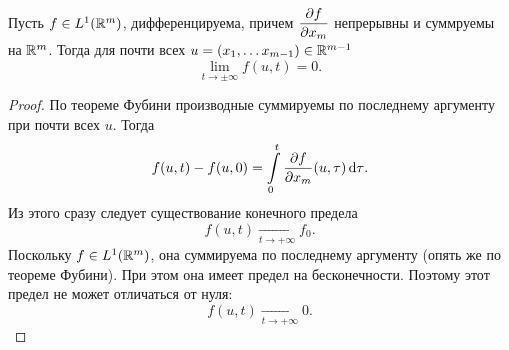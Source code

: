 \begin{lemma}
    Пусть $f \in L^1(\mathbb{R}^m)$, дифференцируема, причем $\dfrac{\partial f}{\partial x_m}$
    непрерывны и суммруемы на $\mathbb{R}^m$. Тогда для почти всех
    $u = (x_1, \ldots x_{m - 1}) \in \mathbb{R}^{m - 1}$
    \[
        \lim_{t \to \pm \infty}{f(u, t)} = 0
    .\]
\end{lemma}
\begin{proof}
    По теореме Фубини производные суммируемы по последнему аргументу
    при почти всех $u$. Тогда
    \[
        f(u, t) - f(u, 0) = \int\limits_0^t{\dfrac{\partial f}{\partial x_m}(u, \tau) \,\mathrm{d} \tau}
    .\]
    Из этого сразу следует существование конечного предела
    \[
        f(u, t) \xrightarrow[t \to +\infty]{} f_0
    .\]
    Поскольку $f \in L^1(\mathbb{R}^m)$, она суммируема по последнему аргументу (опять же
    по теореме Фубини). При этом она имеет предел на бесконечности. Поэтому этот
    предел не может отличаться от нуля:
    \[
        f(u, t) \xrightarrow[t \to +\infty]{} 0
    .\]
\end{proof}

